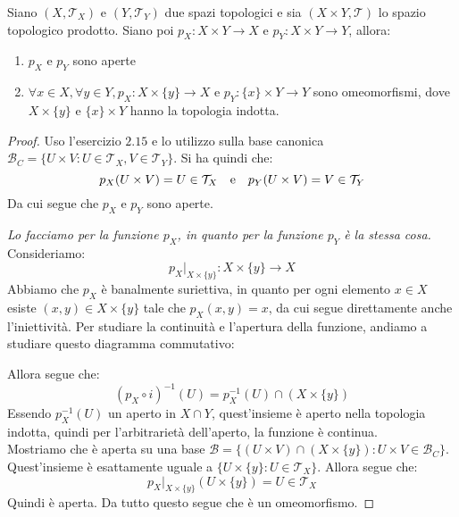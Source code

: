 \documentclass[11pt,a4paper,twoside]{article}
\theoremstyle{definition}
\begin{document}
\begin{prop}{}{}
	Siano $(X, \mathcal T_X)$ e $(Y, \mathcal T_Y)$ due spazi topologici e sia $(X \times Y, \mathcal T)$ lo spazio topologico prodotto. Siano poi $p_X \colon X \times Y \to X$ e $p_Y \colon X \times Y \to Y$, allora:
	\begin{enumerate}
		\item $p_X$ e $p_Y$ sono aperte
		\item $\forall x \in X, \forall y \in Y, p_X \colon X \times \{y\} \to X$ e $p_Y \colon \{x\}\times Y \to Y$ sono omeomorfismi, dove $X \times \{y\}$ e $\{x\} \times Y$ hanno la topologia indotta.
	\end{enumerate}
\end{prop}

\begin{proof}
	 Uso l'esercizio $2.15$ e lo utilizzo sulla base canonica $\mathcal B_C = \{ U \times V: U \in \mathcal T_X, V \in \mathcal T_Y\}$. Si ha quindi che:
	\[ p_X(U \times V) = U \in \mathcal T_X\quad \text e \quad p_Y(U \times V) = V \in \mathcal T_Y \]
	Da cui segue che $p_X$ e $p_Y$ sono aperte.

	 \textit{Lo facciamo per la funzione $p_X$, in quanto per la funzione $p_Y$ è la stessa cosa.}\\
	Consideriamo:
	\[ p_X{\big |}_{X \times \{y\}} \colon X \times \{y\} \to X \]
	Abbiamo che $p_X$ è banalmente suriettiva, in quanto per ogni elemento $x \in X$ esiste $(x, y) \in X \times \{y\}$ tale che $p_X(x,y) = x$, da cui segue direttamente anche l'iniettività.
	Per studiare la continuità e l'apertura della funzione, andiamo a studiare questo diagramma commutativo:

	\begin{center}
	\end{center}

	Allora segue che:
	\[ (p_X \circ i)^{-1}(U) = p_X^{-1}(U) \cap (X \times \{y\})\]
	Essendo $p_X^{-1}(U)$ un aperto in $X \cap Y$, quest'insieme è aperto nella topologia indotta, quindi per l'arbitrarietà dell'aperto, la funzione è continua.\\
	Mostriamo che è aperta su una base $\mathcal B = \{ (U \times V) \cap (X \times \{y\}): U \times V \in \mathcal B_C\}$. Quest'insieme è esattamente uguale a $\{U \times \{y\} : U \in \mathcal T_X\}$. Allora segue che:
	\[p_X{\big |}_{X \times \{y\}} (U \times \{y\}) = U \in \mathcal T_X\]
	Quindi è aperta. Da tutto questo segue che è un omeomorfismo.
\end{proof}
\end{document}
